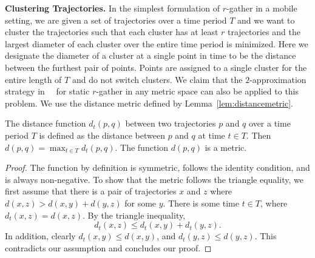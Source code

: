 \medskip\noindent\textbf{Clustering Trajectories.} In the simplest formulation of $r$-gather in a mobile setting, we are given a set of trajectories over a time period $T$ and we want to cluster the trajectories such that each cluster has at least $r$ trajectories and the largest diameter of each cluster over the entire time period is minimized.  Here we designate the diameter of a cluster at a single point in time to be the distance between the furthest pair of points.  Points are assigned to a single cluster for the entire length of $T$ and do not switch clusters.  We claim that the $2$-approximation strategy in~~\cite{Aggarwal06achievinganonymity} for static $r$-gather in any metric space can also be applied to this problem.  
We use the distance metric defined by Lemma~\ref{lem:distancemetric}.  

\begin{lemma}\label{lem:distancemetric}
The distance function $d_t(p,q)$ between two trajectories $p$ and $q$ over a time period $T$ is defined as the distance between $p$ and $q$ at time $t \in T$.  Then $d(p,q) = \max_{t \in T}d_t(p,q)$.  The function $d(p,q)$ is a metric.
\end{lemma}
\begin{proof}
The function by definition is symmetric, follows the identity condition, and is always non-negative.  To show that the metric follows the triangle equality, we first assume that there is a pair of trajectories $x$ and $z$ where $d(x,z) > d(x,y) + d(y,z)$ for some $y$.  There is some time $t \in T$, where $d_t(x,z) = d(x,z)$.  By the triangle inequality,
$$d_t(x,z) \leq d_t(x,y) + d_t(y,z).$$
In addition, clearly $d_t(x, y) \leq d(x, y)$, and $d_t(y, z)\leq d(y, z)$. 
This contradicts our assumption and concludes our proof.
\end{proof}





